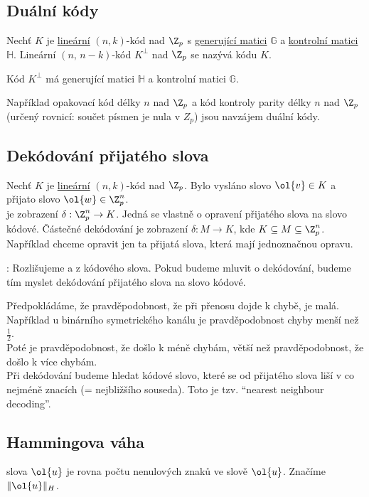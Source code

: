 \subsection{Duální kódy}
Nechť $K$ je \hyperref[linKod]{lineární} $(n,k)$-kód nad $\Z_p$ s \hyperref[genMat]{generující matici} $\mathbb{G}$ a \hyperref[kontMat]{kontrolní matici} $\mathbb{H}$. Lineární $(n,\, n-k)$-kód $K^\perp$ nad $\Z_p$ se nazývá  kódu $K$.

Kód $K^\perp$ má generující matici $\mathbb{H}$ a kontrolní matici $\mathbb{G}$.

Například opakovací kód délky $n$ nad $\Z_p$ a kód kontroly parity délky $n$ nad $\Z_p$ (určený rovnicí: součet písmen je nula v $Z_p$) jsou navzájem duální kódy.

\subsection{Dekódování přijatého slova}
Nechť $K$ je \hyperref[linKod]{lineární} $(n,k)$-kód nad $\Z_p$. Bylo vysláno slovo $\ol{v} \in K$ a přijato slovo $\ol{w} \in \Z_p^n$. \\
 je zobrazení $\delta: \Z_p^n \to K$. Jedná se vlastně o opravení přijatého slova na slovo kódové. Částečné dekódování je zobrazení $\delta : M \to K$, kde $K \subseteq M \subseteq \Z_p^n$. Například chceme opravit jen ta přijatá slova, která mají jednoznačnou opravu.

: Rozlišujeme  a  z kódového slova. Pokud budeme mluvit o dekódování, budeme tím myslet dekódování přijatého slova na slovo kódové.

Předpokládáme, že pravděpodobnost, že při přenosu dojde k chybě, je malá. Například u binárního symetrického kanálu je pravděpodobnost chyby menší než $\frac{1}{2}$. \\
Poté je pravděpodobnost, že došlo k méně chybám, větší než pravděpodobnost, že došlo k více chybám.\\
Při dekódování budeme hledat kódové slovo, které se od přijatého slova liší v co nejméně znacích (= nejbližšího souseda). Toto je tzv. \enquote{nearest neighbour decoding}.

\subsection{Hammingova váha}\label{hamVa}
 slova $\ol{u}$ je rovna počtu nenulových znaků ve slově $\ol{u}$. Značíme $\|\ol{u}\|_H$.

